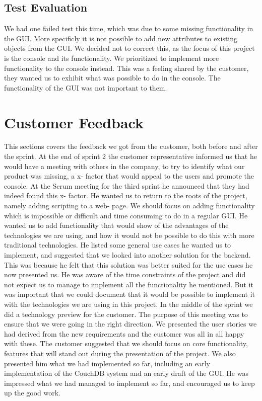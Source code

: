 \subsection{Test Evaluation}
We had one failed test this time, which was due to some missing functionality in the GUI. More specificly it is not possible to add new attributes to existing objects from the GUI. We decided not to correct this, as the focus of this project is the console and its functionality. We prioritized to implement more functionality to the console instead. This was a feeling shared by the customer, they wanted us to exhibit what was possible to do in the console. The functionality of the GUI was not important to them.

\section{Customer Feedback}
This sections covers the feedback we got from the customer, both before and after the sprint.
\newline
\newline
At the end of sprint 2 the customer representative informed us that he would have a meeting with others in the company, to try to identify what our product was missing, a x- factor that would appeal to the users and promote the console. At the Scrum meeting for the third sprint he announced that they had indeed found this x- factor. He wanted us to return to the roots of the project, namely adding scripting to a web- page. We should focus on adding functionality which is impossible or difficult and time consuming to do in a regular GUI.
\newline
\newline
He wanted us to add functionality that would show of the advantages of the technologies we are using, and how it would not be possible to do this with more traditional technologies. He listed some general use cases he wanted us to implement, and suggested that we looked into another solution for the backend. This was because he felt that this solution was better suited for the use cases he now presented us. He was aware of the time constraints of the project and did not expect us to manage to implement all the functionality he mentioned. But it was important that we could document that it would be possible to implement it with the technologies we are using in this project.
\newline
\newline
In the middle of the sprint we did a technology preview for the customer. The purpose of this meeting was to ensure that we were going in the right direction. We presented the user stories we had derived from the new requirements and the customer was all in all happy with these. The customer suggested that we should focus on core functionality, features that will stand out during the presentation of the project. We also presented him what we had implemented so far, including an early implementation of the CouchDB system and an early draft of the GUI. He was impressed what we had managed to implement so far, and encouraged us to keep up the good work.
